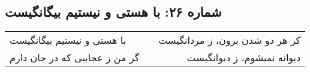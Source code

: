 \begin{center}
\section*{شماره ۲۶: با هستی و نیستیم بیگانگیست}
\label{sec:026}
\begin{longtable}{l p{0.5cm} r}
با هستی و نیستیم بیگانگیست
&&
کز هر دو شدن برون، ز مردانگیست
\\
گر من ز عجایبی که در جان دارم
&&
دیوانه نمیشوم، ز دیوانگیست
\\
\end{longtable}
\end{center}
